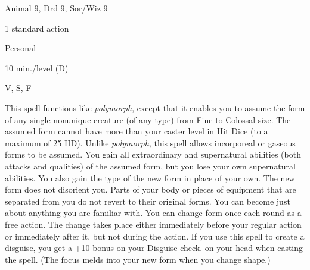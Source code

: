 
\begin{description*}
\item[Level:] Animal 9, Drd 9, Sor/Wiz 9
\item[Casting Time:] 1 standard action
\item[Range:] Personal
\item[Duration:] 10 min./level (D)
\item[Components:] V, S, F
\end{description*}

This spell functions like \textit{polymorph}, except that it enables you to assume
the form of any single nonunique creature (of any type) from Fine to Colossal size.
The assumed form cannot have more than your caster level in Hit Dice (to a maximum
of 25 HD). Unlike \textit{polymorph}, this spell allows incorporeal or gaseous
forms to be assumed.
You gain all extraordinary and supernatural abilities (both attacks and qualities)
of the assumed form, but you lose your own supernatural abilities. You also gain
the type of the new form in place of your own. The new form does not disorient
you. Parts of your body or pieces of equipment that are separated from you do not
revert to their original forms.
You can become just about anything you are familiar with. You can change form once
each round as a free action. The change takes place either immediately before your
regular action or immediately after it, but not during the action. If you use this
spell to create a disguise, you get a +10 bonus on your Disguise check.
on your head when casting the spell. (The focus melds into your new form when you
change shape.)